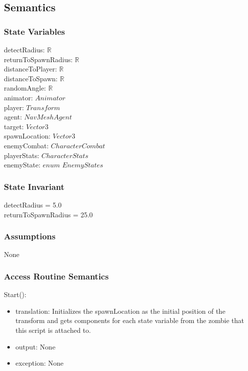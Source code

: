 \documentclass[12pt]{article}
\begin{document}
\subsection* {Semantics}

\subsubsection* {State Variables}

detectRadius: $\mathbb{R}$ \\
returnToSpawnRadius: $\mathbb{R}$ \\
distanceToPlayer: $\mathbb{R}$ \\
distanceToSpawn: $\mathbb{R}$ \\
randomAngle: $\mathbb{R}$ \\
animator: $Animator$ \\
player: $Transform$ \\
agent: $NavMeshAgent$ \\
target: $Vector3$ \\
spawnLocation: $Vector3$ \\
enemyCombat: $CharacterCombat$ \\
playerStats: $CharacterStats$ \\
enemyState: $enum$ $EnemyStates$ 

\subsubsection* {State Invariant}

detectRadius = 5.0 \\
returnToSpawnRadius = 25.0 \\

\subsubsection* {Assumptions}

None

\subsubsection* {Access Routine Semantics}

\noindent Start():
\begin{itemize}
\item translation: Initializes the spawnLocation as the initial position of the transform and gets components for each state variable from the zombie that this script is attached to.
\item output: None
\item exception: None
\end{itemize}
\end{document}
